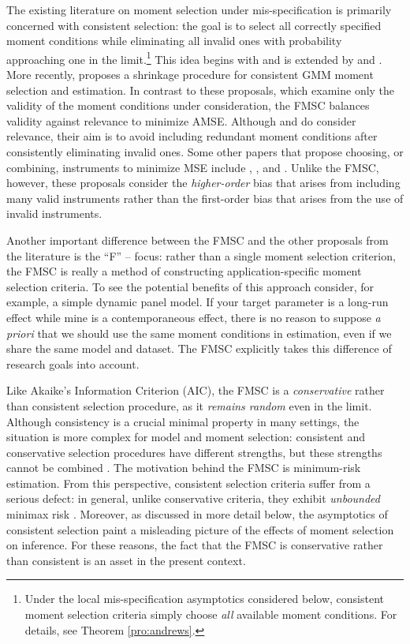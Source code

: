 The existing literature on moment selection under mis-specification is primarily concerned with consistent selection: the goal is to select all correctly specified moment conditions while eliminating all invalid ones with probability approaching one in the limit.\footnote{Under the local mis-specification asymptotics considered below, consistent moment selection criteria simply choose \emph{all} available moment conditions. For details, see Theorem \ref{pro:andrews}.}
This idea begins with \cite{Andrews1999} and is extended by  \cite{AndrewsLu} and \cite{HongPrestonShum}.
More recently, \cite{Liao} proposes a shrinkage procedure for consistent GMM moment selection and estimation. 
In contrast to these proposals, which examine only the validity of the moment conditions under consideration, the FMSC balances validity against relevance to minimize AMSE.
Although \cite{HallPeixe2003} and \cite{ChengLiao} do consider relevance, their aim is to avoid including redundant moment conditions after consistently eliminating invalid ones.
Some other papers that propose choosing, or combining, instruments to minimize MSE include \cite{DonaldNewey2001}, \cite{DonaldImbensNewey2009}, and \cite{KuersteinerOkui2010}.
Unlike the FMSC, however, these proposals consider the \emph{higher-order} bias that arises from including many valid instruments rather than the first-order bias that arises from the use of invalid instruments.

Another important difference between the FMSC and the other proposals from the literature is the ``F'' -- focus: rather than a single moment selection criterion, the FMSC is really a method of constructing application-specific moment selection criteria.
To see the potential benefits of this approach consider, for example, a simple dynamic panel model.
If your target parameter is a long-run effect while mine is a contemporaneous effect, there is no reason to suppose \emph{a priori} that we should use the same moment conditions in estimation, even if we share the same model and dataset.
The FMSC explicitly takes this difference of research goals into account.

Like Akaike's Information Criterion (AIC), the FMSC is a \emph{conservative} rather than consistent selection procedure, as it \emph{remains random} even in the limit.	
Although consistency is a crucial minimal property in many settings, the situation is more complex for model and moment selection: consistent and conservative selection procedures have different strengths, but these strengths cannot be combined \citep{Yang2005}.
The motivation behind the FMSC is minimum-risk estimation.
From this perspective, consistent selection criteria suffer from a serious defect: in general, unlike conservative criteria, they exhibit \emph{unbounded} minimax risk \citep{LeebPoetscher2008}.
Moreover, as discussed in more detail below, the asymptotics of consistent selection paint a misleading picture of the effects of moment selection on inference.
For these reasons, the fact that the FMSC is conservative rather than consistent is an asset in the present context.

